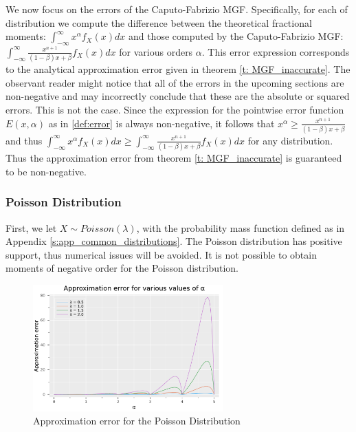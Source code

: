 We now focus on the errors of the Caputo-Fabrizio MGF. Specifically, for each of distribution we compute the difference between the theoretical fractional moments: \(\displaystyle \int_{-\infty}^{\infty} x^\alpha  f_X(x) dx\) and those computed by the Caputo-Fabrizio MGF: \(\displaystyle \int_{-\infty}^{\infty}  \frac{x^{n+1} }{(1 - \beta)x + \beta} f_X(x) dx\) for various orders \(\alpha\). This error expression corresponds to the analytical approximation error given in theorem \ref{t: MGF_inaccurate}.
The observant reader might notice that all of the errors in the upcoming sections are non-negative and may incorrectly conclude that these are the absolute or squared errors. This is not the case. Since the expression for the pointwise error function \(E(x, \alpha)\) as in \ref{def:error} is always non-negative, it follows that \( \displaystyle x^\alpha \geq \frac{x^{n+1} }{(1 - \beta)x + \beta}\) and thus \(\displaystyle \int_{-\infty}^{\infty} x^\alpha  f_X(x) dx \geq  \displaystyle \int_{-\infty}^{\infty}  \frac{x^{n+1} }{(1 - \beta)x + \beta} f_X(x) dx\) for any distribution. Thus the approximation error from theorem \ref{t: MGF_inaccurate} is guaranteed to be non-negative.


\subsubsection{Poisson Distribution}
First, we let \(X \sim Poisson(\lambda)\), with the probability mass function defined as in Appendix \ref{s:app_common_distributions}. The Poisson distribution has positive support, thus numerical issues will be avoided. It is not possible to obtain moments of negative order for the Poisson distribution.

\begin{figure}[H]
    \centering
    \includegraphics[width=0.65\textwidth]{figures/error_plot_poisson.pdf}
    \caption{Approximation error for the Poisson Distribution}
    \label{fig:poisson_plot_error}
\end{figure}


